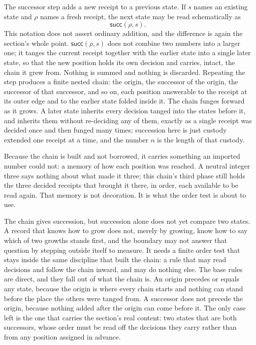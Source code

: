 The successor step adds a new receipt to a previous state. If \(s\) names an existing state and \(\rho\) names a fresh receipt, the next state may be read schematically as
\[
  \mathsf{succ}(\rho,s).
\]
This notation does not assert ordinary addition, and the difference is again the section's whole point. \(\mathsf{succ}(\rho,s)\) does not combine two numbers into a larger one; it tanges the current receipt together with the earlier state into a single later state, so that the new position holds its own decision and carries, intact, the chain it grew from. Nothing is summed and nothing is discarded. Repeating the step produces a finite nested chain: the origin, the successor of the origin, the successor of that successor, and so on, each position answerable to the receipt at its outer edge and to the earlier state folded inside it. The chain funges forward as it grows. A later state inherits every decision tanged into the states before it, and inherits them without re-deciding any of them, exactly as a single receipt was decided once and then funged many times; succession here is just custody extended one receipt at a time, and the number \(n\) is the length of that custody.

Because the chain is built and not borrowed, it carries something an imported number could not: a memory of how each position was reached. A neutral integer three says nothing about what made it three; this chain's third phase still holds the three decided receipts that brought it there, in order, each available to be read again. That memory is not decoration. It is what the order test is about to use.

The chain gives succession, but succession alone does not yet compare two states. A record that knows how to grow does not, merely by growing, know how to say which of two growths stands first, and the boundary may not answer that question by stepping outside itself to measure. It needs a finite order test that stays inside the same discipline that built the chain: a rule that may read decisions and follow the chain inward, and may do nothing else. The base rules are direct, and they fall out of what the chain is. An origin precedes or equals any state, because the origin is where every chain starts and nothing can stand before the place the others were tanged from. A successor does not precede the origin, because nothing added after the origin can come before it. The only case left is the one that carries the section's real content: two states that are both successors, whose order must be read off the decisions they carry rather than from any position assigned in advance.

